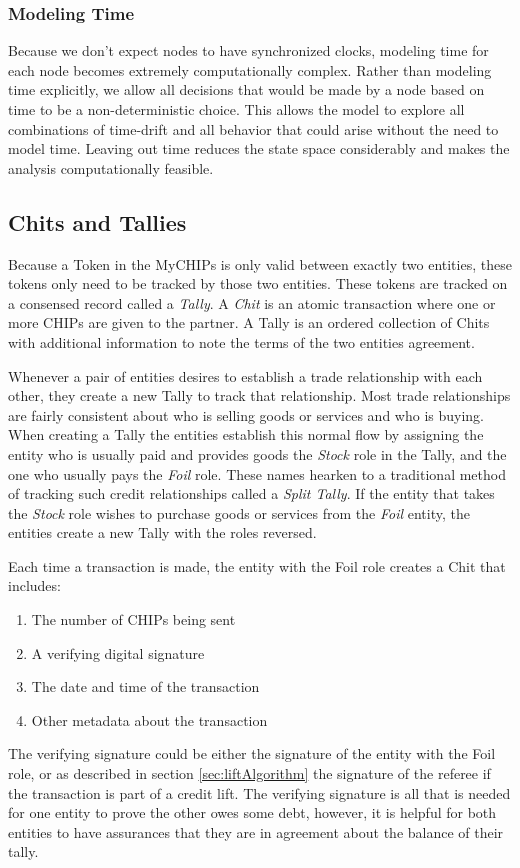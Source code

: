 \documentclass[runningheads]{llncs}
\begin{document}
\subsubsection{Modeling Time}
Because we don't expect nodes to have synchronized clocks, modeling time for each node becomes extremely computationally complex. Rather than modeling time explicitly, we allow all decisions that would be made by a node based on time to be a non-deterministic choice. This allows the model to explore all combinations of time-drift and all behavior that could arise without the need to model time. Leaving out time reduces the state space considerably and makes the analysis computationally feasible. 

\subsection{Chits and Tallies}
Because a Token in the MyCHIPs is only valid between exactly two entities, these tokens only need to be tracked by those two entities. These tokens are tracked on a consensed record called a \emph{Tally}. A \emph{Chit} is an atomic transaction where one or more CHIPs are given to the partner. A Tally is an ordered collection of Chits with additional information to note the terms of the two entities agreement. 

Whenever a pair of entities desires to establish a trade relationship with each other, they create a new Tally to track that relationship. Most trade relationships are fairly consistent about who is selling goods or services and who is buying. When creating a Tally the entities establish this normal flow by assigning the entity who is usually paid and provides goods the \emph{Stock} role in the Tally, and the one who usually pays the \emph{Foil} role. These names hearken to a traditional method of tracking such credit relationships called a \emph{Split Tally}. If the entity that takes the \emph{Stock} role wishes to purchase goods or services from the \emph{Foil} entity, the entities create a new Tally with the roles reversed.

Each time a transaction is made, the entity with the Foil role creates a Chit that includes: 
\begin{enumerate}
    \item The number of CHIPs being sent
    \item A verifying digital signature
    \item The date and time of the transaction
    \item Other metadata about the transaction
\end{enumerate}
The verifying signature could be either the signature of the entity with the Foil role, or as described in section \ref{sec:liftAlgorithm} the signature of the referee if the transaction is part of a credit lift. The verifying signature is all that is needed for one entity to prove the other owes some debt, however, it is helpful for both entities to have assurances that they are in agreement about the balance of their tally. 
\end{document}
